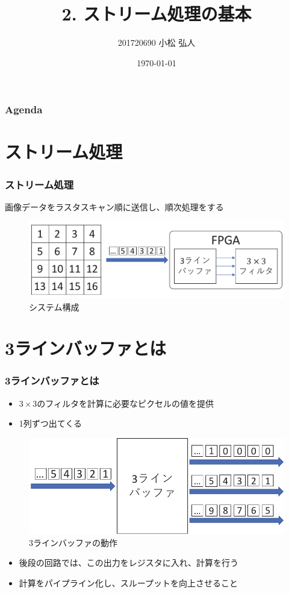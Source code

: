 ﻿\documentclass[dvipdfmx]{beamer}
\title{2. ストリーム処理の基本}
\author{201720690 小松 弘人}
\date{\today}
\begin{document}
\maketitle

\begin{frame}
	\frametitle{Agenda}
	\tableofcontents
\end{frame}

\section{ストリーム処理}
\begin{frame}
	\frametitle{ストリーム処理}
	画像データをラスタスキャン順に送信し、順次処理をする
	\begin{figure}[ht]
		\centering
		\includegraphics[width=0.7\linewidth]{../img/raster.pdf}
		\caption{システム構成}
		\label{img:raster}
	\end{figure}
\end{frame}

\section{3ラインバッファとは}
\begin{frame}
	\frametitle{3ラインバッファとは}
	\begin{itemize}
		\item
			$3\!\times\!3$のフィルタを計算に必要なピクセルの値を提供
		\item
			1列ずつ出てくる
	\end{itemize}
	\begin{figure}[ht]
		\centering
		\includegraphics[width=0.5\linewidth]{../img/3lb.pdf}
		\caption{3ラインバッファの動作}
		\label{img:3linebuf}
	\end{figure}
	\vfill
	\begin{itemize}
		\item
			後段の回路では、この出力をレジスタに入れ、計算を行う
		\item
			計算をパイプライン化し、スループットを向上させること
	\end{itemize}
\end{frame}
\end{document}

